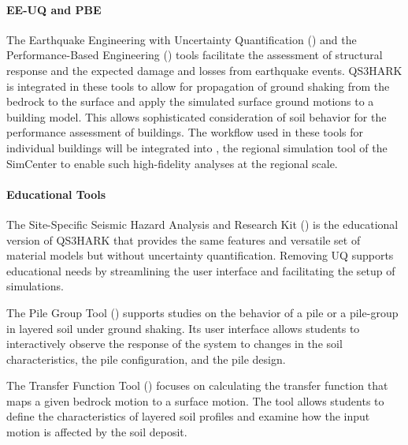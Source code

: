 \paragraph{EE-UQ and PBE} The Earthquake Engineering with Uncertainty Quantification () and the Performance-Based Engineering () tools facilitate the assessment of structural response and the expected damage and losses from earthquake events. QS3HARK is integrated in these tools to allow for propagation of ground shaking from the bedrock to the surface and apply the simulated surface ground motions to a building model. This allows sophisticated consideration of soil behavior for the performance assessment of buildings. The workflow used in these tools for individual buildings will be integrated into , the regional simulation tool of the SimCenter to enable such high-fidelity analyses at the regional scale.

\paragraph{Educational Tools} The Site-Specific Seismic Hazard Analysis and Research Kit () is the educational version of QS3HARK that provides the same features and versatile set of material models but without uncertainty quantification. Removing UQ supports educational needs by streamlining the user interface and facilitating the setup of simulations.

\noindent The Pile Group Tool () supports studies on the behavior of a pile or a pile-group in layered soil under ground shaking. Its user interface allows students to interactively observe the response of the system to changes in the soil characteristics, the pile configuration, and the pile design.

\noindent The Transfer Function Tool () focuses on calculating the transfer function that maps a given bedrock motion to a surface motion. The tool allows students to define the characteristics of layered soil profiles and examine how the input motion is affected by the soil deposit.
